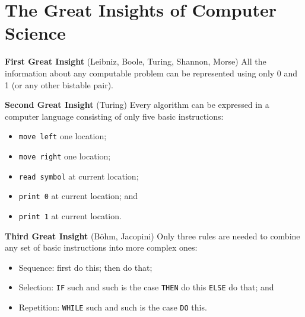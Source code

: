 \documentclass[8pt,a4paper,compress]{beamer}
\begin{document}
\section{The Great Insights of Computer Science}
\begin{frame}[fragile]
\pause
\textbf{First Great Insight} (Leibniz, Boole, Turing, Shannon, Morse) All the information about any computable problem can be represented using only 0 and 1 (or any other bistable pair).

\pause
\smallskip

\textbf{Second Great Insight} (Turing) Every algorithm can be expressed in a computer language consisting of only five basic instructions:
\begin{itemize}
\item \lstinline$move left$ one location; 
\item \lstinline$move right$ one location; 
\item \lstinline$read symbol$ at current location; 
\item \lstinline$print 0$ at current location; and 
\item \lstinline$print 1$ at current location.
\end{itemize}

\pause
\smallskip

\textbf{Third Great Insight} (B\"{o}hm, Jacopini) Only three rules are needed to combine any set of basic instructions into more complex ones: 
\begin{itemize}
\item Sequence: first do this; then do that; 
\item Selection: \lstinline$IF$ such and such is the case \lstinline$THEN$ do this \lstinline$ELSE$ do that; and 
\item Repetition: \lstinline$WHILE$ such and such is the case \lstinline$DO$ this.
\end{itemize}
\end{frame}
\end{document}
